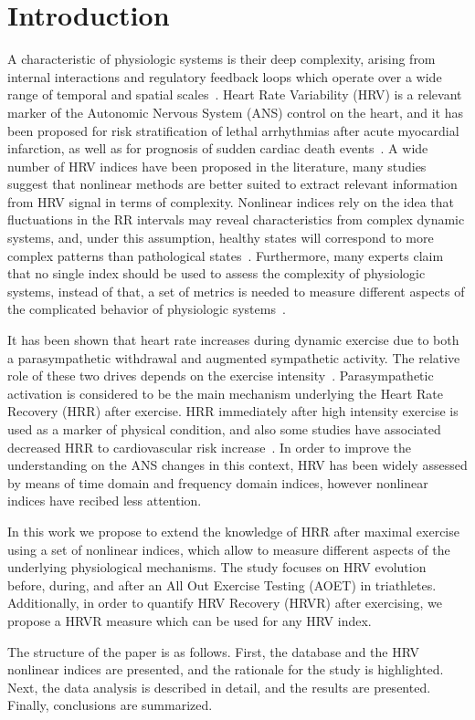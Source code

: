 
\section{Introduction}

A characteristic of physiologic systems is their deep complexity,  arising from internal interactions and regulatory feedback loops which operate over a wide range of temporal and spatial scales~\cite{Goldberger02}. Heart Rate Variability (HRV) is a relevant marker of the Autonomic Nervous System (ANS) control on the heart, and it has been proposed for risk stratification of lethal arrhythmias after acute myocardial infarction, as well as for prognosis of sudden cardiac death events~\cite{Malik89,Huikuri00}. A wide number of HRV indices have been proposed in the literature, many studies suggest that nonlinear methods are better suited to extract relevant information  from HRV signal in terms of complexity. Nonlinear indices rely on the idea that fluctuations in the RR intervals may reveal characteristics from complex dynamic systems, and, under this assumption, healthy states will correspond to more complex patterns than pathological states~\cite{Huikuri00,goldberger91,pincus91}.  Furthermore, many experts claim that no single index should be used to assess the complexity of physiologic systems, instead of that, a set of metrics is needed to measure different aspects of the complicated behavior of physiologic systems~\cite{Goldberger02}.

It has been shown that heart rate increases during dynamic exercise due to both a parasympathetic withdrawal and augmented sympathetic activity. The relative role of these two drives depends on the exercise intensity~\cite{Aubert03}. Parasympathetic activation is considered to be the main mechanism underlying the Heart Rate Recovery (HRR) after exercise. HRR immediately after high intensity exercise is used as a marker of physical condition, and also some studies have associated decreased HRR to cardiovascular risk increase~\cite{Cabrera97}. In order to improve the understanding on the ANS changes in this context, HRV has been widely assessed by means of  time domain and frequency domain indices, however nonlinear indices have recibed less attention.  

In this work we propose to extend the knowledge of HRR after maximal exercise using a set of nonlinear indices, which allow to measure different aspects of the underlying physiological mechanisms. The study focuses on HRV evolution before, during, and after an All Out Exercise Testing (AOET) in triathletes. Additionally, in order to quantify HRV Recovery (HRVR) after exercising, we propose a HRVR measure which can be used for any HRV index. 

The structure of the paper is as follows. First, the database and the HRV nonlinear indices are presented, and the rationale for the study is highlighted. Next, the data analysis is described in detail, and the results are presented. Finally, conclusions are summarized.
